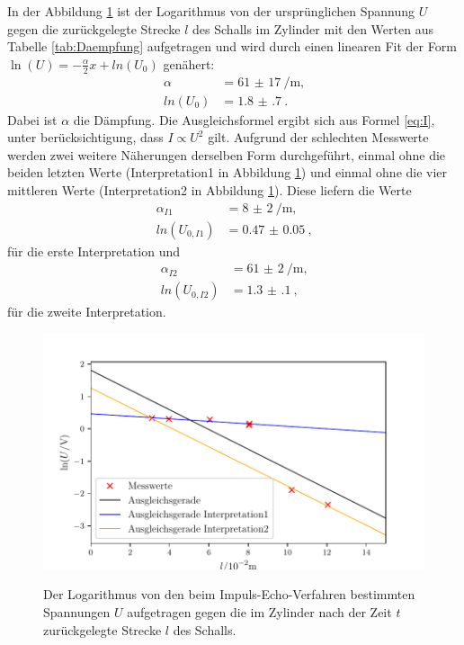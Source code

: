 \noindent In der Abbildung \ref{fig:Daempfung} ist der Logarithmus von der ursprünglichen Spannung $U$ gegen die zurückgelegte Strecke $l$ des Schalls im Zylinder mit den Werten aus Tabelle \ref{tab:Daempfung} aufgetragen und wird durch einen linearen Fit der Form $\ln(U)=-\frac{\alpha}{2} x + ln(U_0)$ genähert:
\begin{align*}
	\alpha	&= \SI{61(17)}{\per\meter}\text{,}\\
	ln(U_0)	&=\SI{1.8(7)}{}\text{.}
\end{align*}
Dabei ist $\alpha$ die Dämpfung. Die Ausgleichsformel ergibt sich aus Formel \eqref{eq:I}, unter berücksichtigung, dass $I\propto U^2$ gilt.
Aufgrund der schlechten Messwerte werden zwei weitere Näherungen derselben Form durchgeführt, einmal ohne die beiden letzten Werte (Interpretation1 in Abbildung \ref{fig:Daempfung}) und einmal ohne die vier mittleren Werte (Interpretation2 in Abbildung \ref{fig:Daempfung}). Diese liefern die Werte
\begin{align*}
	\alpha_{I1} &= \SI{8(2)}{\per\meter}\text{,}\\
	ln(U_{0,I1})&=\SI{0.47(5)}{}\text{,}
\end{align*} 
für die erste Interpretation und
\begin{align*}
	\alpha_{I2} &= \SI{61(2)}{\per\meter}\text{,}\\
	ln(U_{0,I2})&=\SI{1.3(1)}{}\text{,}
\end{align*}
für die zweite Interpretation.

\begin{figure}
	\centering
	\caption{Der Logarithmus von den beim Impuls-Echo-Verfahren bestimmten Spannungen $U$ aufgetragen gegen die im Zylinder nach der Zeit $t$ zurückgelegte Strecke $l$ des Schalls.}
	\includegraphics[width=\linewidth-70pt,height=\textheight-70pt,keepaspectratio]{content/images/Daempfung.pdf}
	\label{fig:Daempfung}
\end{figure}

